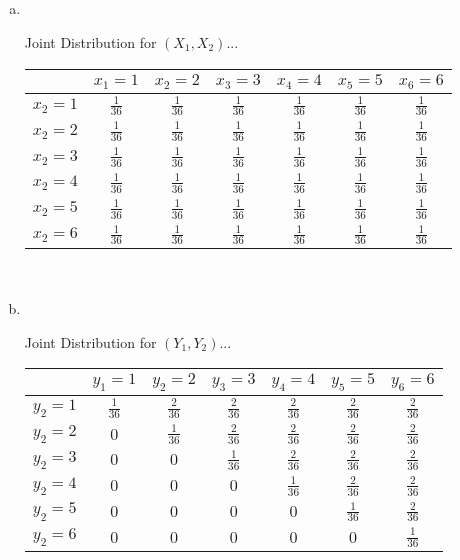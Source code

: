 \documentclass[10pt]{report}
\begin{document}
 \subsection{}
 \begin{enumerate}[(a)]
        \item \ \\
        \begin{center}
        Joint Distribution for $(X_1,X_2)$... \\
 \begin{tabular}{|c| c|c|c|c|c|c|} 
 \hline
  & $x_1=1$ & $x_2=2$ & $x_3=3$ & $x_4=4$ & $x_5=5$ & $x_6=6$ \\
 \hline
 $x_2=1$ & $\frac{1}{36}$ & $\frac{1}{36}$& $\frac{1}{36}$& $\frac{1}{36}$& $\frac{1}{36}$& $\frac{1}{36}$\\ 
 \hline
 $x_2=2$ & $\frac{1}{36}$& $\frac{1}{36}$& $\frac{1}{36}$& $\frac{1}{36}$& $\frac{1}{36}$& $\frac{1}{36}$\\
 \hline
 $x_2=3$& $\frac{1}{36}$& $\frac{1}{36}$& $\frac{1}{36}$& $\frac{1}{36}$& $\frac{1}{36}$& $\frac{1}{36}$ \\
 \hline
 $x_2=4$ & $\frac{1}{36}$& $\frac{1}{36}$& $\frac{1}{36}$& $\frac{1}{36}$& $\frac{1}{36}$& $\frac{1}{36}$ \\
 \hline
  $x_2=5$ & $\frac{1}{36}$& $\frac{1}{36}$& $\frac{1}{36}$& $\frac{1}{36}$& $\frac{1}{36}$& $\frac{1}{36}$\\
 \hline
  $x_2=6$ & $\frac{1}{36}$& $\frac{1}{36}$& $\frac{1}{36}$& $\frac{1}{36}$& $\frac{1}{36}$& $\frac{1}{36}$ \\
 \hline
\end{tabular}\ \\
\end{center}
        \item \ \\
        \begin{center}
        Joint Distribution for $(Y_1,Y_2)$... \\
 \begin{tabular}{|c|c|c|c|c|c|c|} 
 \hline
  & $y_1=1$ & $y_2=2$ & $y_3=3$ & $y_4=4$ & $y_5=5$ & $y_6=6$ \\
 \hline
 $y_2=1$ & $\frac{1}{36}$ & $\frac{2}{36}$& $\frac{2}{36}$& $\frac{2}{36}$& $\frac{2}{36}$& $\frac{2}{36}$\\ 
 \hline
 $y_2=2$ & $0$& $\frac{1}{36}$& $\frac{2}{36}$& $\frac{2}{36}$& $\frac{2}{36}$& $\frac{2}{36}$\\
 \hline
 $y_2=3$& $0$& $0$& $\frac{1}{36}$& $\frac{2}{36}$& $\frac{2}{36}$& $\frac{2}{36}$ \\
 \hline
 $y_2=4$ & $0$& $0$& $0$& $\frac{1}{36}$& $\frac{2}{36}$& $\frac{2}{36}$ \\
 \hline
  $y_2=5$ & $0$& $0$& $0$& $0$& $\frac{1}{36}$& $\frac{2}{36}$\\
 \hline
  $y_2=6$ & $0$& $0$& $0$& $0$& $0$& $\frac{1}{36}$ \\
 \hline
\end{tabular}\ \\
\end{center}
    \end{enumerate}
    \setcounter{subsection}{14}
\end{document}
